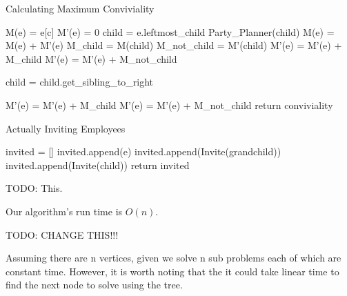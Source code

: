 \documentclass{article}
\begin{document}
\begin{algorithm}
    \caption{Calculating Maximum Conviviality}
    \begin{algorithmic}
            \State M(e) = e[c]
            \State M'(e) = 0
            \State child = e.leftmost\_child
                \State Party\_Planner(child)
                \State M(e) = M(e) + M'(e)
                \State M\_child = M(child)
                \State M\_not\_child = M'(child)
                 
                    \State M'(e) = M'(e) + M\_child
                \Else
                    \State M'(e) = M'(e) + M\_not\_child
                \EndIf
                
                \State child = child.get\_sibling\_to\_right
            \EndWhile
            
            
            \If{}
                \State M'(e) = M'(e) + M\_child
            \Else
                \State M'(e) = M'(e) + M\_not\_child
            \EndIf
        \State return conviviality
        \EndProcedure
    \end{algorithmic}
\end{algorithm}


\begin{algorithm}
    \caption{Actually Inviting Employees}
    \begin{algorithmic}
            \State invited = [] 
                    \State invited.append(e)
                        \State invited.append(Invite(grandchild))
                    \EndFor
                \Else
                        \State invited.append(Invite(child))
                    \EndFor
                \EndIf
                \State return invited
        \EndProcedure
    \end{algorithmic}
\end{algorithm}


TODO: This.


Our algorithm's run time is $O(n)$. 

TODO: CHANGE THIS!!!

Assuming there are n vertices, given we solve n sub problems each of which are constant time. However, it is worth noting that the it could take linear time to find the next node to solve using the tree.
\end{document}
